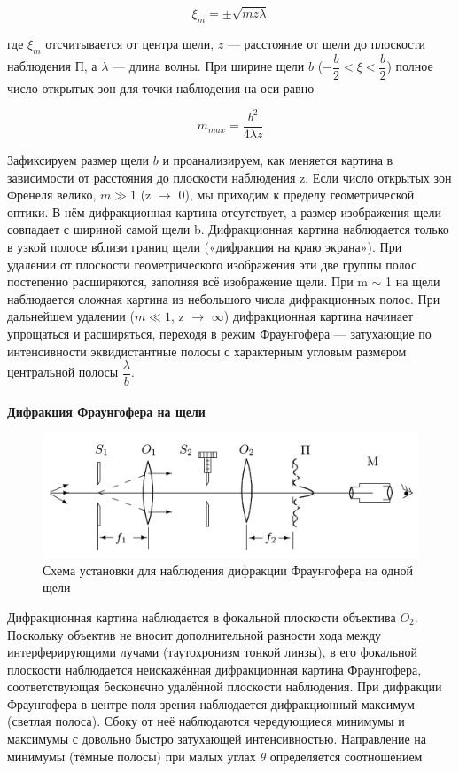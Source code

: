 \documentclass[a4paper, 12pt]{article}
\begin{document}
    \begin{equation*}
        \xi_m = \pm \sqrt{mz\lambda}
    \end{equation*}
    
    где $\xi_m$ отсчитывается от центра щели, $z$ — расстояние от щели до плоскости наблюдения П, а $\lambda$ — длина волны. При ширине щели $b$ ($-\dfrac{b}{2} < \xi < \dfrac{b}{2}$) полное число открытых зон для точки наблюдения на оси равно

    \begin{equation*}
        m_{max} = \dfrac{b^2}{4 \lambda z}
    \end{equation*}
    
    Зафиксируем размер щели $b$ и проанализируем, как меняется картина в зависимости от расстояния до плоскости наблюдения z. Если число открытых зон Френеля велико, $m \gg 1$ (z $\to$ 0), мы приходим к пределу геометрической оптики. В нём дифракционная картина отсутствует, а размер изображения щели совпадает с шириной самой щели b. Дифракционная картина наблюдается только в узкой полосе вблизи границ щели («дифракция на краю экрана»). При удалении от плоскости геометрического изображения эти две группы полос постепенно расширяются, заполняя всё изображение щели. При m $\sim$ 1 на щели наблюдается сложная картина из небольшого числа дифракционных полос. При дальнейшем удалении ($m \ll 1$, z $\to$ $\infty$) дифракционная картина начинает упрощаться  и расширяться, переходя в режим Фраунгофера — затухающие по интенсивности эквидистантные полосы с характерным угловым размером центральной полосы $\dfrac{\lambda}{b}$.\\
\\
\textbf{Дифракция Фраунгофера на щели}
    \begin{figure}
        \centering
        \includegraphics[width=0.6\linewidth]{fraun_one_setup.png}
        \caption{Схема установки для наблюдения дифракции Фраунгофера на одной щели}
        \label{fig:fraun_one}
    \end{figure}

    Дифракционная картина наблюдается в фокальной плоскости объектива $O_2$. Поскольку объектив не вносит дополнительной разности хода между интерферирующими лучами (таутохронизм тонкой линзы), в его фокальной плоскости наблюдается неискажённая дифракционная картина Фраунгофера, соответствующая бесконечно удалённой плоскости наблюдения. При дифракции Фраунгофера в центре поля зрения наблюдается дифракционный максимум (светлая полоса). Сбоку от неё наблюдаются чередующиеся минимумы и максимумы с довольно быстро затухающей интенсивностью. Направление на минимумы (тёмные полосы) при малых углах $\theta$ определяется соотношением 
    
\end{document}
